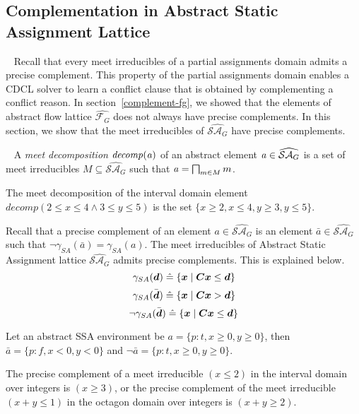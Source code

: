 \subsection{Complementation in Abstract Static Assignment Lattice}~\label{complement}
%
Recall that every meet irreducibles of a partial assignments domain admits a
precise complement.  This property of the partial assignments domain enables a
CDCL solver to learn a conflict clause that is obtained by complementing a 
conflict reason.  In section~\ref{complement-fg}, we showed that the elements 
of abstract flow lattice $\widehat{\mathcal{F}_G}$ does not always have precise 
complements.  In this section, we show that the meet irreducibles of 
$\widehat{\mathcal{SA}_G}$ have precise complements. 
%
\begin{definition}~\label{meet-decomp}
A \emph{meet decomposition} ${\mathit{decomp}}(\mathit{a})$ of an abstract 
element $\mathit{a} \in \widehat{\mathcal{SA}_{G}}$ is a set of meet 
irreducibles $M \subseteq \widehat{\mathcal{SA}_{G}}$ such that 
$\mathit{a}=\bigsqcap_{m\in M} m$.
\end{definition}
%
\begin{example} The meet decomposition of the interval domain element
$decomp(2\leq x\leq 4 \wedge 3\leq y\leq 5)$ is
the set $\{x\geq 2, x\leq 4, y\geq 3, y\leq 5\}$.
\end{example}
%
Recall that a precise complement of an element $a \in \widehat{\mathcal{SA}_G}$ 
is an element $\bar{a} \in \widehat{\mathcal{SA}_G}$ such that $\neg \gamma_{SA}(\bar{a}) =
\gamma_{SA}(a)$.  The meet irreducibles of Abstract Static Assignment lattice 
$\widehat{\mathcal{SA}_G}$ admits precise complements. This is explained below. 
%
\[
   \gamma_{SA}(\vec{\numabsval}) \mathrel{\hat=} \{\vec{\numvar}\mid
   \mat{C}\vec{\numvar}\leq\vec{\numabsval}\} 
\]
\[
   \gamma_{SA}(\bar{\vec{\numabsval}}) \mathrel{\hat=} \{\vec{\numvar}\mid
   \mat{C}\vec{\numvar} > \vec{\numabsval}\} 
\]
\[
   \neg \gamma_{SA}(\bar{\vec{\numabsval}}) \mathrel{\hat=} \{\vec{\numvar}\mid
   \mat{C}\vec{\numvar} \leq \vec{\numabsval}\} 
\]
%
\begin{example}
Let an abstract SSA environment be $a = \{p:t,x\geq0,y\geq0\}$, 
then $\bar{a} = \{p:f,x<0,y<0\}$ and $\neg \bar{a} = \{p:t,x\geq0,y\geq0\}$.
\end{example}
%
\begin{example}
The precise complement of a meet irreducible $(x \leq 2)$ in
the interval domain over integers is $(x \geq 3)$, or the precise complement
of the meet irreducible $(x+y \leq 1)$ in the octagon domain over integers
is $(x+y \geq 2)$.  
\end{example}
